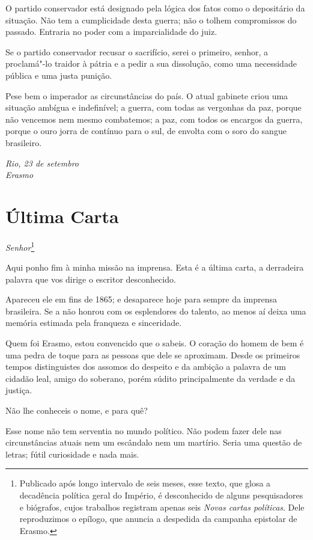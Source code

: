 O partido conservador está designado pela lógica dos fatos como o
depositário da situação. Não tem a cumplicidade desta guerra; não o
tolhem compromissos do passado. Entraria no poder com a imparcialidade do juiz.

Se o partido conservador recusar o sacrifício, serei o primeiro,
senhor, a proclamá"-lo traidor à pátria e a pedir a sua dissolução,
como uma necessidade pública e uma justa punição.

Pese bem o imperador as circunstâncias do país. O atual gabinete criou
uma situação ambígua e indefinível; a guerra, com todas as vergonhas da
paz, porque não vencemos nem mesmo combatemos; a paz, com todos os
encargos da guerra, porque o ouro jorra de contínuo para o sul, de
envolta com o soro do sangue brasileiro. 

\begin{flushright}
\textit{Rio, 23 de setembro\\
Erasmo}
\end{flushright}

\chapter{Última Carta}

\noindent\textit{Senhor}\footnote{ Publicado após longo intervalo de seis meses, esse texto, 
que glosa a decadência política geral do Império, é desconhecido de alguns pesquisadores e biógrafos, 
cujos trabalhos registram apenas seis \textit{Novas cartas políticas}. Dele reproduzimos o epílogo, 
que anuncia a despedida da campanha epistolar de Erasmo.}\smallskip

 Aqui ponho fim à minha missão na imprensa. Esta é a última carta, a
derradeira palavra que vos dirige o escritor desconhecido. 

 Apareceu ele em fins de 1865; e desaparece hoje para sempre da imprensa
brasileira. Se a não honrou com os esplendores do talento, ao menos aí
deixa uma memória estimada pela franqueza e sinceridade. 

 Quem foi Erasmo, estou convencido que o sabeis. O coração do homem de
bem é uma pedra de toque para as pessoas que dele se aproximam. Desde
os primeiros tempos distinguistes dos assomos do despeito e da ambição
a palavra de um cidadão leal, amigo do soberano, porém súdito
principalmente da verdade e da justiça.  

 Não lhe conheceis o nome, e para quê? 

 Esse nome não tem serventia no mundo político. Não podem fazer dele nas
circunstâncias atuais nem um escândalo nem um martírio. Seria uma
questão de letras; fútil curiosidade e nada mais. 

